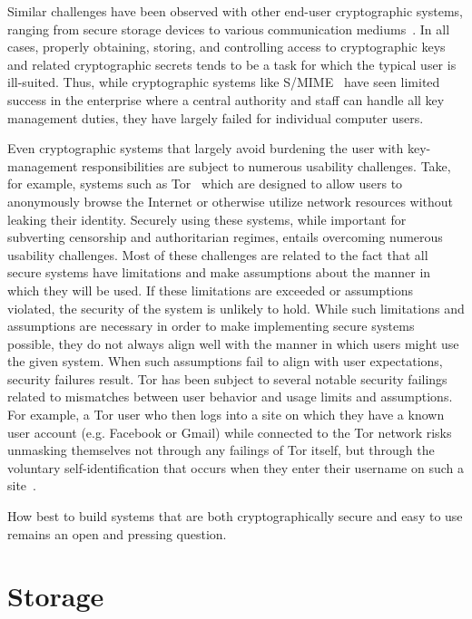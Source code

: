 Similar challenges have been observed with other end-user
cryptographic systems, ranging from secure storage devices to various
communication mediums~\cite{sweikata2009}. In all cases, properly
obtaining, storing, and controlling access to cryptographic keys and
related cryptographic secrets tends to be a task for which the typical
user is ill-suited. Thus, while cryptographic systems like
S/MIME~\cite{ramsdell-rfc5751} have seen limited success in the
enterprise where a central authority and staff can handle all key
management duties, they have largely failed for individual computer
users.

Even cryptographic systems that largely avoid burdening the user with
key-management responsibilities are subject to numerous usability
challenges. Take, for example, systems such as
Tor~\cite{Dingledine2004} which are designed to allow users to
anonymously browse the Internet or otherwise utilize network resources
without leaking their identity. Securely using these systems, while
important for subverting censorship and authoritarian regimes, entails
overcoming numerous usability challenges. Most of these challenges are
related to the fact that all secure systems have limitations and make
assumptions about the manner in which they will be used. If these
limitations are exceeded or assumptions violated, the security of the
system is unlikely to hold. While such limitations and assumptions are
necessary in order to make implementing secure systems possible, they
do not always align well with the manner in which users might use the
given system. When such assumptions fail to align with user
expectations, security failures result. Tor has been subject to
several notable security failings related to mismatches between user
behavior and usage limits and assumptions. For example, a Tor user who
then logs into a site on which they have a known user account
(e.g. Facebook or Gmail) while connected to the Tor network risks
unmasking themselves not through any failings of Tor itself, but
through the voluntary self-identification that occurs when they enter
their username on such a site~\cite{goodin-dreadpirate}.

How best to build systems that are both cryptographically
secure and easy to use remains an open and pressing question.

\section{Storage}
\label{chap:background:storage}


